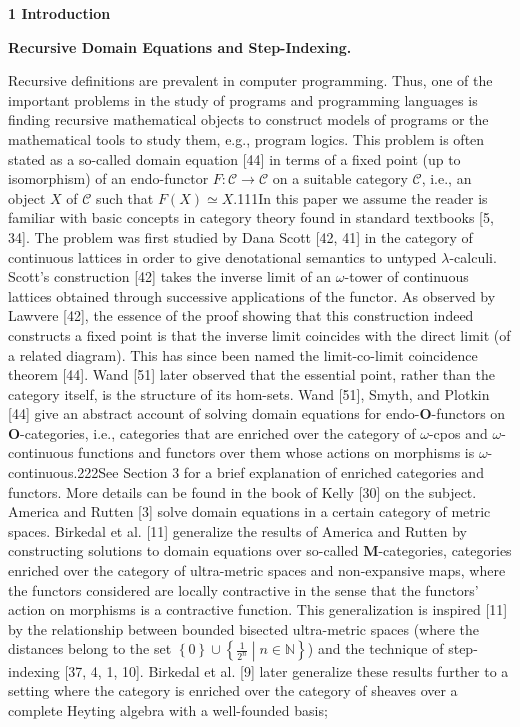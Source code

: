 
 
\par\medskip\noindent\textbf{1 Introduction}\par
 
 
\par\medskip\noindent\textbf{Recursive Domain Equations and Step-Indexing.}\par
 
 
Recursive definitions are prevalent in computer programming. Thus, one of the important problems in the study of programs and programming languages is finding recursive mathematical objects to construct models of programs or the mathematical tools to study them, e.g., program logics. This problem is often stated as a so-called domain equation [44] in terms of a fixed point (up to isomorphism) of an endo-functor $F:\mathcal{C}\to\mathcal{C}$ on a suitable category $\mathcal{C}$, i.e., an object $X$ of $\mathcal{C}$ such that $F(X)\simeq X$.111In this paper we assume the reader is familiar with basic concepts in category theory found in standard textbooks [5, 34]. The problem was first studied by Dana Scott [42, 41] in the category of continuous lattices in order to give denotational semantics to untyped $\lambda$-calculi. Scott’s construction [42] takes the inverse limit of an $\omega$-tower of continuous lattices obtained through successive applications of the functor. As observed by Lawvere [42], the essence of the proof showing that this construction indeed constructs a fixed point is that the inverse limit coincides with the direct limit (of a related diagram). This has since been named the limit-co-limit coincidence theorem [44]. Wand [51] later observed that the essential point, rather than the category itself, is the structure of its hom-sets. Wand [51], Smyth, and Plotkin [44] give an abstract account of solving domain equations for endo-$\mathbf{O}$-functors on $\mathbf{O}$-categories, i.e., categories that are enriched over the category of $\omega$-cpos and $\omega$-continuous functions and functors over them whose actions on morphisms is $\omega$-continuous.222See Section 3 for a brief explanation of enriched categories and functors. More details can be found in the book of Kelly [30] on the subject. America and Rutten [3] solve domain equations in a certain category of metric spaces. Birkedal et al. [11] generalize the results of America and Rutten by constructing solutions to domain equations over so-called $\mathbf{M}$-categories, categories enriched over the category of ultra-metric spaces and non-expansive maps, where the functors considered are locally contractive in the sense that the functors’ action on morphisms is a contractive function. This generalization is inspired [11] by the relationship between bounded bisected ultra-metric spaces (where the distances belong to the set $\left\{0\right\}\cup\left\{\frac{1}{2^{n}}\middle|n\in\mathbb{N}\right\}$) and the technique of step-indexing [37, 4, 1, 10]. Birkedal et al. [9] later generalize these results further to a setting where the category is enriched over the category of sheaves over a complete Heyting algebra with a well-founded basis; 